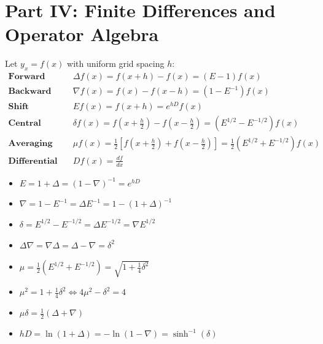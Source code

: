 \section{Part IV: Finite Differences and Operator Algebra}

\begin{conceptbox}
Let $y_x = f(x)$ with uniform grid spacing $h$:
\begin{align}
    \textbf{Forward Difference:} \quad &\Delta f(x) = f(x+h) - f(x) = (E - 1) f(x) \\
    \textbf{Backward Difference:} \quad &\nabla f(x) = f(x) - f(x-h) = (1 - E^{-1}) f(x) \\
    \textbf{Shift Operator:} \quad &E f(x) = f(x+h) = e^{h D} f(x) \\
    \textbf{Central Difference:} \quad &\delta f(x) = f\left(x + \frac{h}{2}\right) - f\left(x - \frac{h}{2}\right) = (E^{1/2} - E^{-1/2}) f(x) \\
    \textbf{Averaging Operator:} \quad &\mu f(x) = \frac{1}{2}\left[ f\left(x + \frac{h}{2}\right) + f\left(x - \frac{h}{2}\right) \right] = \frac{1}{2}(E^{1/2} + E^{-1/2}) f(x) \\
    \textbf{Differential Operator:} \quad &D f(x) = \frac{df}{dx}
\end{align}
\end{conceptbox}

\begin{theorembox}
\begin{minipage}{0.48\textwidth}
\begin{itemize}[noitemsep]
    \item $E = 1 + \Delta = (1 - \nabla)^{-1} = e^{hD}$
    \item $\nabla = 1 - E^{-1} = \Delta E^{-1} = 1 - (1+\Delta)^{-1}$
    \item $\delta = E^{1/2} - E^{-1/2} = \Delta E^{-1/2} = \nabla E^{1/2}$
    \item $\Delta \nabla = \nabla \Delta = \Delta - \nabla = \delta^2$
\end{itemize}
\end{minipage}
\hfill
\begin{minipage}{0.48\textwidth}
\begin{itemize}[noitemsep]
    \item $\mu = \frac{1}{2}(E^{1/2} + E^{-1/2}) = \sqrt{1 + \frac{1}{4}\delta^2}$
    \item $\mu^2 = 1 + \frac{1}{4}\delta^2 \iff 4\mu^2 - \delta^2 = 4$
    \item $\mu \delta = \frac{1}{2}(\Delta + \nabla)$
    \item $h D = \ln(1 + \Delta) = -\ln(1 - \nabla) = \sinh^{-1}(\delta)$
\end{itemize}
\end{minipage}
\end{theorembox}

